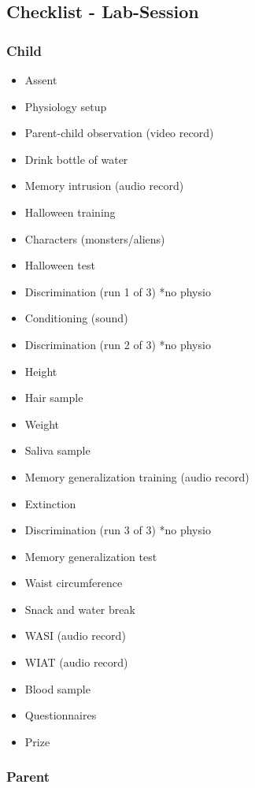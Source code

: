 \documentclass[]{book}
\providecommand{\tightlist}{%
  \setlength{\itemsep}{0pt}\setlength{\parskip}{0pt}}
\begin{document}
\hypertarget{checklist---lab-session}{%
\subsection{Checklist - Lab-Session}\label{checklist---lab-session}}

\hypertarget{child}{%
\subsubsection{Child}\label{child}}

\begin{itemize}
\tightlist
\item
  Assent
\item
  Physiology setup
\item
  Parent-child observation (video record)
\item
  Drink bottle of water
\item
  Memory intrusion (audio record)
\item
  Halloween training
\item
  Characters (monsters/aliens)
\item
  Halloween test
\item
  Discrimination (run 1 of 3) *no physio
\item
  Conditioning (sound)
\item
  Discrimination (run 2 of 3) *no physio
\item
  Height
\item
  Hair sample
\item
  Weight
\item
  Saliva sample
\item
  Memory generalization training (audio record)
\item
  Extinction
\item
  Discrimination (run 3 of 3) *no physio
\item
  Memory generalization test
\item
  Waist circumference
\item
  Snack and water break
\item
  WASI (audio record)
\item
  WIAT (audio record)
\item
  Blood sample
\item
  Questionnaires
\item
  Prize
\end{itemize}

\hypertarget{parent}{%
\subsubsection{Parent}\label{parent}}
\end{document}
